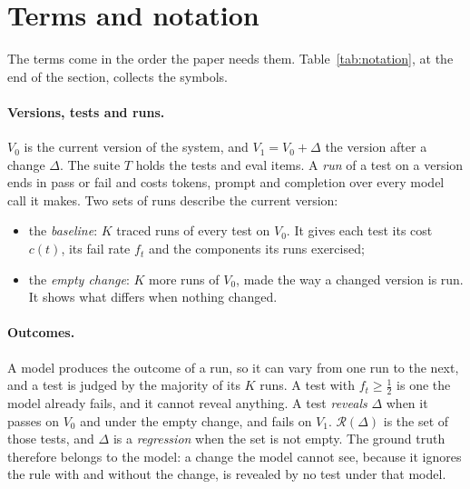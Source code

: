 \documentclass[11pt,a4paper]{article}
\newcommand{\Rev}{\mathcal{R}}
\begin{document}
\section{Terms and notation}
\label{sec:abstractions}

The terms come in the order the paper needs them. Table~\ref{tab:notation}, at the end of the section, collects
the symbols.

\paragraph{Versions, tests and runs.} $V_0$ is the current version of the system, and $V_1 = V_0 + \Delta$ the
version after a change $\Delta$. The suite $T$ holds the tests and eval items. A \emph{run} of a test on a
version ends in pass or fail and costs tokens, prompt and completion over every model call it makes. Two sets of
runs describe the current version:
\begin{itemize}
  \item the \emph{baseline}: $K$ traced runs of every test on $V_0$. It gives each test its cost $c(t)$, its
        fail rate $f_t$ and the components its runs exercised;
  \item the \emph{empty change}: $K$ more runs of $V_0$, made the way a changed version is run. It shows what
        differs when nothing changed.
\end{itemize}

\paragraph{Outcomes.} A model produces the outcome of a run, so it can vary from one run to the next, and a test
is judged by the majority of its $K$ runs. A test with $f_t \ge \tfrac12$ is one the model already fails, and it
cannot reveal anything. A test \emph{reveals} $\Delta$ when it passes on $V_0$ and under the empty change, and
fails on $V_1$. $\Rev(\Delta)$ is the set of those tests, and $\Delta$ is a \emph{regression} when the set is not
empty. The ground truth therefore belongs to the model: a change the model cannot see, because it ignores the rule
with and without the change, is revealed by no test under that model.
\end{document}
